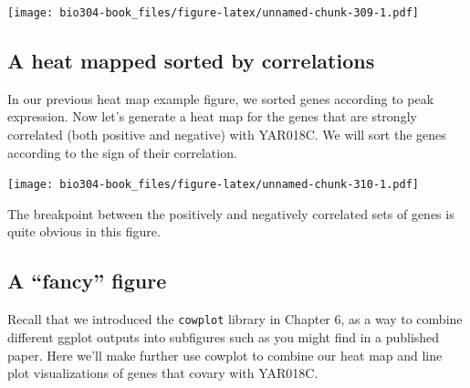 \documentclass[]{book}
\newenvironment{Shaded}{\begin{snugshade}}{\end{snugshade}}
\newcommand{\CommentTok}[1]{\textcolor[rgb]{0.56,0.35,0.01}{\textit{#1}}}
\newcommand{\DataTypeTok}[1]{\textcolor[rgb]{0.13,0.29,0.53}{#1}}
\newcommand{\KeywordTok}[1]{\textcolor[rgb]{0.13,0.29,0.53}{\textbf{#1}}}
\newcommand{\NormalTok}[1]{#1}
\newcommand{\OperatorTok}[1]{\textcolor[rgb]{0.81,0.36,0.00}{\textbf{#1}}}
\newcommand{\StringTok}[1]{\textcolor[rgb]{0.31,0.60,0.02}{#1}}
\theoremstyle{definition}
\theoremstyle{definition}
\theoremstyle{definition}
\theoremstyle{remark}
\begin{document}
\texttt{[image: bio304-book\_files/figure-latex/unnamed-chunk-309-1.pdf]}

\hypertarget{a-heat-mapped-sorted-by-correlations}{%
\subsection{A heat mapped sorted by
correlations}\label{a-heat-mapped-sorted-by-correlations}}

In our previous heat map example figure, we sorted genes according to
peak expression. Now let's generate a heat map for the genes that are
strongly correlated (both positive and negative) with YAR018C. We will
sort the genes according to the sign of their correlation.

\begin{Shaded}
\end{Shaded}

\texttt{[image: bio304-book\_files/figure-latex/unnamed-chunk-310-1.pdf]}

The breakpoint between the positively and negatively correlated sets of
genes is quite obvious in this figure.

\hypertarget{a-fancy-figure}{%
\subsection{A ``fancy'' figure}\label{a-fancy-figure}}

Recall that we introduced the \texttt{cowplot} library in Chapter 6, as
a way to combine different ggplot outputs into subfigures such as you
might find in a published paper. Here we'll make further use cowplot to
combine our heat map and line plot visualizations of genes that covary
with YAR018C.
\end{document}
